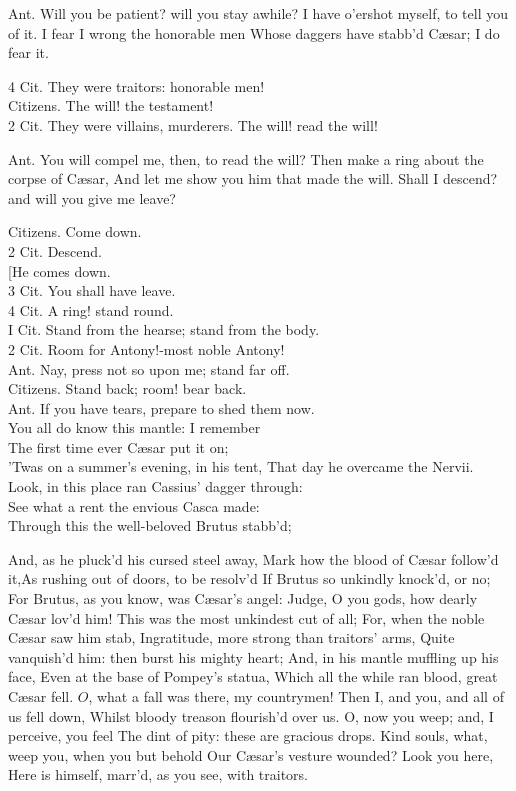 \documentclass[10pt]{article}
\begin{document}
Ant. Will you be patient? will you stay awhile? I have o'ershot myself, to tell you of it. I fear I wrong the honorable men Whose daggers have stabb'd Cæsar; I do fear it.

4 Cit. They were traitors: honorable men!\\
Citizens. The will! the testament!\\
2 Cit. They were villains, murderers. The will! read the will!

Ant. You will compel me, then, to read the will? Then make a ring about the corpse of Cæsar, And let me show you him that made the will. Shall I descend? and will you give me leave?

Citizens. Come down.\\
2 Cit. Descend.\\[0pt]
[He comes down.\\
3 Cit. You shall have leave.\\
4 Cit. A ring! stand round.\\
I Cit. Stand from the hearse; stand from the body.\\
2 Cit. Room for Antony!-most noble Antony!\\
Ant. Nay, press not so upon me; stand far off.\\
Citizens. Stand back; room! bear back.\\
Ant. If you have tears, prepare to shed them now.\\
You all do know this mantle: I remember\\
The first time ever Cæsar put it on;\\
'Twas on a summer's evening, in his tent, That day he overcame the Nervii.\\
Look, in this place ran Cassius' dagger through:\\
See what a rent the envious Casca made:\\
Through this the well-beloved Brutus stabb'd;

And, as he pluck'd his cursed steel away, Mark how the blood of Cæsar follow'd it,As rushing out of doors, to be resolv'd If Brutus so unkindly knock'd, or no; For Brutus, as you know, was Cæsar's angel: Judge, O you gods, how dearly Cæsar lov'd him! This was the most unkindest cut of all; For, when the noble Cæsar saw him stab, Ingratitude, more strong than traitors' arms, Quite vanquish'd him: then burst his mighty heart; And, in his mantle muffling up his face, Even at the base of Pompey's statua, Which all the while ran blood, great Cæsar fell. $O$, what a fall was there, my countrymen! Then I, and you, and all of us fell down, Whilst bloody treason flourish'd over us. O, now you weep; and, I perceive, you feel The dint of pity: these are gracious drops. Kind souls, what, weep you, when you but behold Our Cæsar's vesture wounded? Look you here, Here is himself, marr'd, as you see, with traitors.
\end{document}
